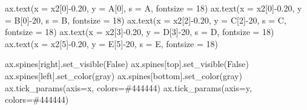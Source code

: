 \documentclass[
  letterpaper,
  DIV=11,
  numbers=noendperiod]{scrreprt}
\newenvironment{Shaded}{\begin{snugshade}}{\end{snugshade}}
\newcommand{\DecValTok}[1]{\textcolor[rgb]{0.68,0.00,0.00}{#1}}
\newcommand{\FloatTok}[1]{\textcolor[rgb]{0.68,0.00,0.00}{#1}}
\newcommand{\NormalTok}[1]{\textcolor[rgb]{0.00,0.23,0.31}{#1}}
\newcommand{\OperatorTok}[1]{\textcolor[rgb]{0.37,0.37,0.37}{#1}}
\newcommand{\StringTok}[1]{\textcolor[rgb]{0.13,0.47,0.30}{#1}}
\newcommand{\VariableTok}[1]{\textcolor[rgb]{0.07,0.07,0.07}{#1}}
\begin{document}
\begin{Shaded}
\begin{Highlighting}[]
\NormalTok{ax.text(x }\OperatorTok{=}\NormalTok{ x2[}\DecValTok{0}\NormalTok{]}\OperatorTok{{-}}\FloatTok{0.20}\NormalTok{, y }\OperatorTok{=}\NormalTok{ A[}\DecValTok{0}\NormalTok{], s }\OperatorTok{=} \StringTok{\textquotesingle{}A\textquotesingle{}}\NormalTok{, fontsize }\OperatorTok{=} \DecValTok{18}\NormalTok{)}
\NormalTok{ax.text(x }\OperatorTok{=}\NormalTok{ x2[}\DecValTok{0}\NormalTok{]}\OperatorTok{{-}}\FloatTok{0.20}\NormalTok{, y }\OperatorTok{=}\NormalTok{ B[}\DecValTok{0}\NormalTok{]}\OperatorTok{{-}}\DecValTok{20}\NormalTok{, s }\OperatorTok{=} \StringTok{\textquotesingle{}B\textquotesingle{}}\NormalTok{, fontsize }\OperatorTok{=} \DecValTok{18}\NormalTok{)}
\NormalTok{ax.text(x }\OperatorTok{=}\NormalTok{ x2[}\DecValTok{2}\NormalTok{]}\OperatorTok{{-}}\FloatTok{0.20}\NormalTok{, y }\OperatorTok{=}\NormalTok{ C[}\DecValTok{2}\NormalTok{]}\OperatorTok{{-}}\DecValTok{20}\NormalTok{, s }\OperatorTok{=} \StringTok{\textquotesingle{}C\textquotesingle{}}\NormalTok{, fontsize }\OperatorTok{=} \DecValTok{18}\NormalTok{)}
\NormalTok{ax.text(x }\OperatorTok{=}\NormalTok{ x2[}\DecValTok{3}\NormalTok{]}\OperatorTok{{-}}\FloatTok{0.20}\NormalTok{, y }\OperatorTok{=}\NormalTok{ D[}\DecValTok{3}\NormalTok{]}\OperatorTok{{-}}\DecValTok{20}\NormalTok{, s }\OperatorTok{=} \StringTok{\textquotesingle{}D\textquotesingle{}}\NormalTok{, fontsize }\OperatorTok{=} \DecValTok{18}\NormalTok{)}
\NormalTok{ax.text(x }\OperatorTok{=}\NormalTok{ x2[}\DecValTok{5}\NormalTok{]}\OperatorTok{{-}}\FloatTok{0.20}\NormalTok{, y }\OperatorTok{=}\NormalTok{ E[}\DecValTok{5}\NormalTok{]}\OperatorTok{{-}}\DecValTok{20}\NormalTok{, s }\OperatorTok{=} \StringTok{\textquotesingle{}E\textquotesingle{}}\NormalTok{, fontsize }\OperatorTok{=} \DecValTok{18}\NormalTok{)}

\NormalTok{ax.spines[}\StringTok{\textquotesingle{}right\textquotesingle{}}\NormalTok{].set\_visible(}\VariableTok{False}\NormalTok{)}
\NormalTok{ax.spines[}\StringTok{\textquotesingle{}top\textquotesingle{}}\NormalTok{].set\_visible(}\VariableTok{False}\NormalTok{)}
\NormalTok{ax.spines[}\StringTok{\textquotesingle{}left\textquotesingle{}}\NormalTok{].set\_color(}\StringTok{\textquotesingle{}gray\textquotesingle{}}\NormalTok{)}
\NormalTok{ax.spines[}\StringTok{\textquotesingle{}bottom\textquotesingle{}}\NormalTok{].set\_color(}\StringTok{\textquotesingle{}gray\textquotesingle{}}\NormalTok{)}
\NormalTok{ax.tick\_params(axis}\OperatorTok{=}\StringTok{\textquotesingle{}x\textquotesingle{}}\NormalTok{, colors}\OperatorTok{=}\StringTok{\textquotesingle{}\#444444\textquotesingle{}}\NormalTok{)}
\NormalTok{ax.tick\_params(axis}\OperatorTok{=}\StringTok{\textquotesingle{}y\textquotesingle{}}\NormalTok{, colors}\OperatorTok{=}\StringTok{\textquotesingle{}\#444444\textquotesingle{}}\NormalTok{)}


\end{Highlighting}
\end{Shaded}
\end{document}
